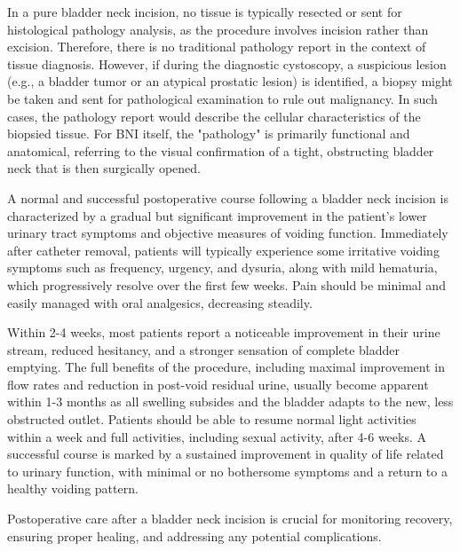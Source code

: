 In a pure bladder neck incision, no tissue is typically resected or sent for histological pathology analysis, as the procedure involves incision rather than excision. Therefore, there is no traditional pathology report in the context of tissue diagnosis. However, if during the diagnostic cystoscopy, a suspicious lesion (e.g., a bladder tumor or an atypical prostatic lesion) is identified, a biopsy might be taken and sent for pathological examination to rule out malignancy. In such cases, the pathology report would describe the cellular characteristics of the biopsied tissue. For BNI itself, the "pathology" is primarily functional and anatomical, referring to the visual confirmation of a tight, obstructing bladder neck that is then surgically opened.

A normal and successful postoperative course following a bladder neck incision is characterized by a gradual but significant improvement in the patient's lower urinary tract symptoms and objective measures of voiding function. Immediately after catheter removal, patients will typically experience some irritative voiding symptoms such as frequency, urgency, and dysuria, along with mild hematuria, which progressively resolve over the first few weeks. Pain should be minimal and easily managed with oral analgesics, decreasing steadily.

Within 2-4 weeks, most patients report a noticeable improvement in their urine stream, reduced hesitancy, and a stronger sensation of complete bladder emptying. The full benefits of the procedure, including maximal improvement in flow rates and reduction in post-void residual urine, usually become apparent within 1-3 months as all swelling subsides and the bladder adapts to the new, less obstructed outlet. Patients should be able to resume normal light activities within a week and full activities, including sexual activity, after 4-6 weeks. A successful course is marked by a sustained improvement in quality of life related to urinary function, with minimal or no bothersome symptoms and a return to a healthy voiding pattern.

Postoperative care after a bladder neck incision is crucial for monitoring recovery, ensuring proper healing, and addressing any potential complications.

